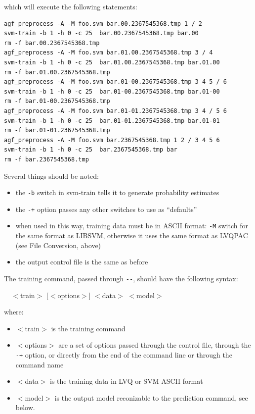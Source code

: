 \documentclass[12pt]{article}
\begin{document}
which will execute the following statements:

\begin{verbatim}
agf_preprocess -A -M foo.svm bar.00.2367545368.tmp 1 / 2
svm-train -b 1 -h 0 -c 25  bar.00.2367545368.tmp bar.00
rm -f bar.00.2367545368.tmp
agf_preprocess -A -M foo.svm bar.01.00.2367545368.tmp 3 / 4
svm-train -b 1 -h 0 -c 25  bar.01.00.2367545368.tmp bar.01.00
rm -f bar.01.00.2367545368.tmp
agf_preprocess -A -M foo.svm bar.01-00.2367545368.tmp 3 4 5 / 6
svm-train -b 1 -h 0 -c 25  bar.01-00.2367545368.tmp bar.01-00
rm -f bar.01-00.2367545368.tmp
agf_preprocess -A -M foo.svm bar.01-01.2367545368.tmp 3 4 / 5 6
svm-train -b 1 -h 0 -c 25  bar.01-01.2367545368.tmp bar.01-01
rm -f bar.01-01.2367545368.tmp
agf_preprocess -A -M foo.svm bar.2367545368.tmp 1 2 / 3 4 5 6
svm-train -b 1 -h 0 -c 25  bar.2367545368.tmp bar
rm -f bar.2367545368.tmp
\end{verbatim}

Several things should be noted:
\begin{itemize}
\item the \verb/-b/ switch in svm-train tells it to generate probability estimates
\item the \verb/-+/ option passes any other switches to use as ``defaults''
\item when used in this way, training data must be in ASCII format: \verb/-M/ switch for the same format as LIBSVM, otherwise it uses the same format as LVQPAC (see File Conversion, above)
\item the output control file is the same as before
\end{itemize}

The training command, passed through \verb/--/, should have the following syntax:

\verb/  /$<$train$>$ [$<$options$>$] $<$data$>$ $<$model$>$

where:
\begin{itemize}
\item $<$train$>$ is the training command
\item $<$options$>$ are a set of options passed through the control file, through the \verb/-+/ option, or directly from the end of the command line or through the command name
\item $<$data$>$ is the training data in LVQ or SVM ASCII format
\item $<$model$>$ is the output model reconizable to the prediction command, see below.
\end{itemize}
\end{document}
